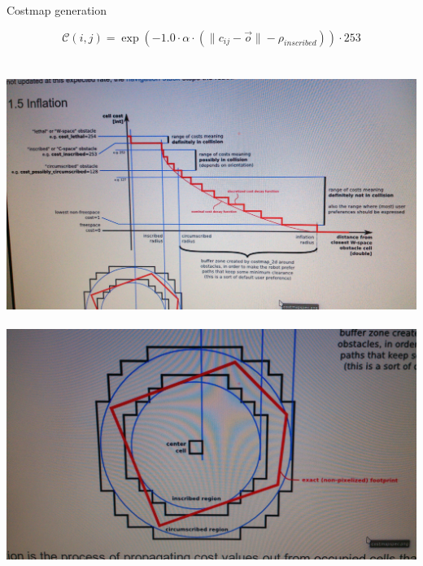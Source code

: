\begin{frame}{Costmap generation}
   \begin{center}
    \begin{equation}\nonumber
      \mathcal{C}(i, j) = \exp (-1.0 \cdot \alpha \cdot ( \|c_{ij}-\vec{o}\| - \rho_{inscribed})) \cdot 253
    \end{equation}\\~\\
    \includegraphics[height=0.5\textheight]{cost_levels}
    ~
    \includegraphics[height=0.5\textheight]{inscribed_circumscribed}
  \end{center}
  
  \note {

  }
\end{frame}

